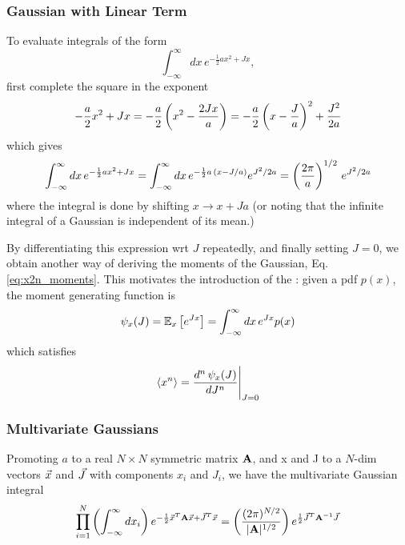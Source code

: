 \documentclass[11pt]{article}
\begin{document}
\subsubsection{Gaussian with Linear Term}
To evaluate integrals of the form
\begin{equation}
  \label{eq:int_gauss_a2_j}
  \int_{-\infty}^{\infty} dx\, e^{-\frac{1}{2} a x^2 + J x},
\end{equation}
first complete the square in the exponent
\begin{equation}
  -\frac{a}{2} x^2 + J x = -\frac{a}{2} \left( x^2 - \frac{2Jx}{a} \right) =
  -\frac{a}{2} \left( x - \frac{J}{a} \right)^2 + \frac{J^2}{2a}
\end{equation}
which gives
\begin{equation}
  \int_{-\infty}^{\infty} dx\, e^{-\frac{1}{2} a x^2 + J x} =
  \int_{-\infty}^{\infty} dx\, e^{-\frac{1}{2} a\, \left( x - J/a \right)} e^{J^2 / 2a} =
  \left(\frac{2\pi}{a} \right)^{1/2} \, e^{J^2 / 2a}
\end{equation}
where the integral is done by shifting $x \to x + J a$ (or noting that the infinite
integral of a Gaussian is independent of its mean.)

By differentiating this expression wrt $J$ repeatedly, and finally setting $J=0$, we
obtain another way of deriving the moments of the Gaussian,
Eq. \eqref{eq:x2n_moments}. This motivates the introduction of the : given a pdf $p(x)$, the moment generating function is
\begin{equation}
  \psi_x(J) = \mathbb{E}_x \left[ e^{J x} \right] = \int_{-\infty}^{\infty} dx\, e^{J x} p(x)
\end{equation}
which satisfies
\begin{equation}
  \langle x^n \rangle = \frac{d^n\, \psi_x(J)}{d J^n}\Bigg|_{J=0}
\end{equation}





\subsubsection{Multivariate Gaussians}
Promoting $a$ to a real $N \times N$ symmetric matrix $\mathbf{A}$, and x and J to a $N$-dim
vectors $\vec{x}$ and $\vec{J}$ with components $x_i$ and $J_i$, we have the multivariate
Gaussian integral 
\begin{equation}
  \prod_{i=1}^N \left( \int_{-\infty}^{\infty} dx_i \right)
  e^{-\frac{1}{2} \vec{x}^T \mathbf{A} \vec{x} + \vec{J}^T \vec{x}} =
  \left( \frac{(2 \pi)^{N/2}}{|\mathbf{A}|^{1/2}} \right) e^{\frac{1}{2} \vec{J}^T \mathbf{A}^{-1} \vec{J}}
\end{equation}
\TODOFIN{}
\end{document}
